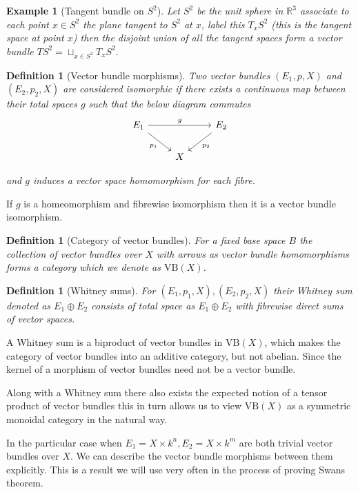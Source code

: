 \documentclass[12pt]{report}
\numberwithin{equation}{section}
\newcommand{\R}{\mathbb{R}}
\newtheorem{definition}[dummy]{Definition}
\newtheorem{example}[dummy]{Example}
\begin{document}
	\begin{example}[Tangent bundle on $S^2$]
		Let $S^2$ be the unit sphere in $\R^3$ associate to each point $x \in S^2$ the plane tangent to $S^2$ at $x$, label this $T_xS^2$ (this is the tangent space at point $x$) then the disjoint union of all the tangent spaces form a vector bundle $T S^2 = \sqcup_{x \in S^2} T_x S^2.$ 
	\end{example}
	\begin{definition}[Vector bundle morphisms]
		Two vector bundles $(E_1,p, X)$ and $(E_2,p_2, X) $ are considered isomorphic if there exists a continuous map between their total spaces $g$ such that the below diagram commutes
		\[\begin{tikzcd}
			{E_1} && {E_2} \\
			& X
			\arrow["{p_1}"', from=1-1, to=2-2]
			\arrow["{p_2}", from=1-3, to=2-2]
			\arrow["g", from=1-1, to=1-3]
		\end{tikzcd}\]
		
		and $g$ induces a vector space homomorphism for each fibre.
	\end{definition}
	If $g$ is a homeomorphism and fibrewise isomorphism then it is a vector bundle isomorphism.
	
	\begin{definition}[Category of vector bundles]
		For a fixed base space $B$ the collection of vector bundles over $X$ with arrows as vector bundle homomorphisms forms a category which we denote as $\mathrm{VB}(X)$.
	\end{definition}
	\begin{definition}[Whitney sums]
		For $(E_1,p_1, X), (E_2,p_2,X)$ their Whitney sum denoted as $E_1 \oplus E_2$ consists of total space as $E_1 \oplus E_2$ with fibrewise direct sums of vector spaces.
	\end{definition}
	A Whitney sum is a biproduct of vector bundles in $\mathrm{VB}(X)$, which makes the category of vector bundles into an additive category, but not abelian. Since the kernel of a morphism of vector bundles need not be a vector bundle. 
	
	Along with a Whitney sum there also exists the expected notion of a tensor product of vector bundles this in turn allows us to view $\mathrm{VB}(X)$ as a symmetric monoidal category in the natural way.
	
	In the particular case when $E_1=X \times k^n, E_2=X \times k^m$ are both trivial vector bundles over $X$. We can describe the vector bundle morphisms between them explicitly. This is a result we will use very often in the process of proving Swans theorem. 
	
\end{document}
